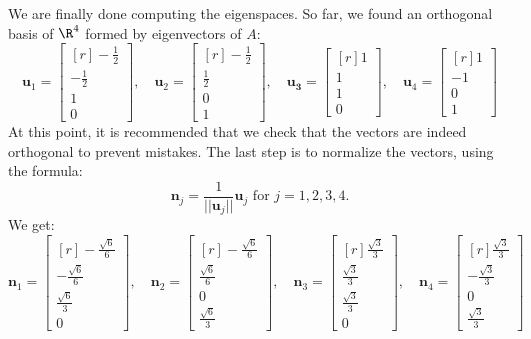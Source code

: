 \documentclass[12pt]{article}
\begin{document}
We are finally done computing the eigenspaces. So far, we found an orthogonal basis of $\R^4$ formed by eigenvectors of $A$:
\[
\mathbf{u}_1=\left[\begin{matrix*}[r]- \frac{1}{2}\\-\frac{1}{2}\\1\\0\end{matrix*}\right],\quad
\mathbf{u}_2=\left[\begin{matrix*}[r]- \frac{1}{2}\\\frac{1}{2}\\0\\1\end{matrix*}\right],\quad
\mathbf{u_3}=\begin{bmatrix*}[r]1\\1\\1\\0\end{bmatrix*},\quad
\mathbf{u}_4=\left[\begin{matrix*}[r]1\\-1\\0\\1\end{matrix*}\right]
\]
At this point, it is recommended that we check that the vectors are indeed orthogonal to prevent mistakes.
The last step is to normalize the vectors, using the formula:
\[
\mathbf{n}_j=\frac{1}{||\mathbf{u}_j||}\mathbf{u}_j\text{ for $j=1,2,3,4$}.
\]
We get:
\[
\mathbf{n}_1=\left[\begin{matrix*}[r]- \frac{\sqrt{6}}{6}\\- \frac{\sqrt{6}}{6}\\\frac{\sqrt{6}}{3}\\0\end{matrix*}\right],\quad
\mathbf{n}_2=\left[\begin{matrix*}[r]- \frac{\sqrt{6}}{6}\\\frac{\sqrt{6}}{6}\\0\\\frac{\sqrt{6}}{3}\end{matrix*}\right],\quad
\mathbf{n}_3=\left[\begin{matrix*}[r]\frac{\sqrt{3}}{3}\\\frac{\sqrt{3}}{3}\\\frac{\sqrt{3}}{3}\\0\end{matrix*}\right],\quad
\mathbf{n}_4=\left[\begin{matrix*}[r]\frac{\sqrt{3}}{3}\\- \frac{\sqrt{3}}{3}\\0\\\frac{\sqrt{3}}{3}\end{matrix*}\right]
\]
\end{document}
